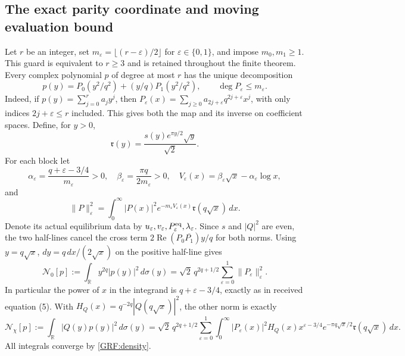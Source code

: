 \documentclass[11pt,a4paper]{article}
\begin{document}
\subsection{The exact parity coordinate and moving evaluation bound}

Let $r$ be an integer, set $m_\varepsilon=\lfloor(r-\varepsilon)/2\rfloor$
for $\varepsilon\in\{0,1\}$, and impose $m_0,m_1\ge1$.
This guard is equivalent to $r\ge3$ and is retained throughout the finite
theorem. Every complex polynomial $p$ of degree at most $r$ has the unique
decomposition
\[
 p(y)=P_0(y^2/q^2)+(y/q)P_1(y^2/q^2),\qquad
 \deg P_\varepsilon\le m_\varepsilon.
\]
Indeed, if $p(y)=\sum_{j=0}^r a_jy^j$, then
$P_\varepsilon(x)=\sum_{j\ge0}a_{2j+\varepsilon}
q^{2j+\varepsilon}x^j$, with only indices $2j+\varepsilon\le r$ included.
This gives both the map and its inverse on coefficient spaces.
Define, for $y>0$,
\[
 \mathfrak r(y)=\frac{s(y)e^{\pi y/2}\sqrt y}{\sqrt2}.
\]
For each block let
\begin{equation*}\tag{GRF9}\label{GRF:blockparameters}
 \alpha_\varepsilon=\frac{q+\varepsilon-3/4}{m_\varepsilon}>0,
 \quad \beta_\varepsilon=\frac{\pi q}{2m_\varepsilon}>0,
 \quad V_\varepsilon(x)=\beta_\varepsilon\sqrt x-
                                      \alpha_\varepsilon\log x,
\end{equation*}
and
\[
 \|P\|_\varepsilon^2=
 \int_0^\infty |P(x)|^2e^{-m_\varepsilon V_\varepsilon(x)}
                         \mathfrak r(q\sqrt x)\,d x.
\]
Denote its actual equilibrium data by
$u_\varepsilon,v_\varepsilon,P^{\rm eq}_\varepsilon,\lambda_\varepsilon$.
Since $s$ and $|Q|^2$ are even, the two half-lines cancel the cross term
$2\operatorname{Re}(P_0\overline{P_1})y/q$ for both norms. Using
$y=q\sqrt x$, $dy=q\,dx/(2\sqrt x)$ on the positive half-line gives
\begin{equation*}\tag{GRF10}\label{GRF:paritynorm}
 \mathcal N_0[p]:=\int_\mathbb R y^{2q}|p(y)|^2\,d\sigma(y)
 =\sqrt2\,q^{2q+1/2}\sum_{\varepsilon=0}^1\|P_\varepsilon\|_\varepsilon^2.
\end{equation*}
In particular the power of $x$ in the integrand is
$q+\varepsilon-3/4$, exactly as in received equation (5).
With
$H_Q(x)=q^{-2q}|Q(q\sqrt x)|^2$, the other norm is exactly
\begin{equation*}\tag{GRF11}\label{GRF:parityroot}
 \mathcal N_\chi[p]:=\int_\mathbb R |Q(y)p(y)|^2\,d\sigma(y)
 =\sqrt2\,q^{2q+1/2}
 \sum_{\varepsilon=0}^1
 \int_0^\infty |P_\varepsilon(x)|^2H_Q(x)x^{\varepsilon-3/4}
 e^{-\pi q\sqrt x/2}\mathfrak r(q\sqrt x)\,d x.
\end{equation*}
All integrals converge by \eqref{GRF:density}.
\end{document}
